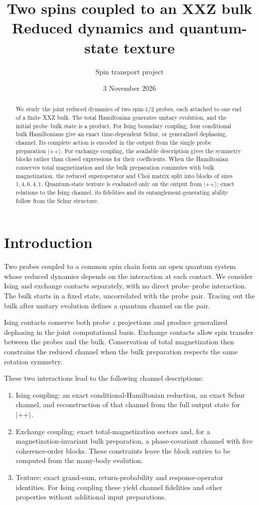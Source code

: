 \documentclass[11pt,a4paper]{article}
\title{Two spins coupled to an XXZ bulk\\[3pt]
\large Reduced dynamics and quantum-state texture}
\author{Spin transport project}
\date{3 November 2026}
\newcommand{\ket}[1]{\lvert #1\rangle}
\begin{document}
\maketitle
\begin{abstract}
We study the joint reduced dynamics of two spin-$1/2$ probes,
each attached to one end of a finite XXZ bulk. The total Hamiltonian generates
unitary evolution, and the initial probe--bulk state is a product. For Ising
boundary coupling, four conditional bulk Hamiltonians give an exact
time-dependent Schur, or generalized dephasing, channel. Its complete action
is encoded in the output from the single probe preparation $\ket{++}$.
For exchange coupling, the available description gives the symmetry
blocks rather than closed expressions for their coefficients. When the Hamiltonian conserves total
magnetization and the bulk preparation commutes with bulk magnetization,
the reduced superoperator and Choi matrix split into blocks of sizes
$1,4,6,4,1$. Quantum-state texture is evaluated only on the output from
$\ket{++}$; exact relations to the Ising channel, its fidelities and its
entanglement-generating ability follow from the Schur structure.
\end{abstract}
\tableofcontents

\section{Introduction}

Two probes coupled to a common spin chain form an open quantum system
whose reduced dynamics depends on the interaction at each contact.
We consider Ising and exchange contacts separately, with no direct
probe--probe interaction. The bulk starts in a fixed state, uncorrelated
with the probe pair. Tracing out the bulk after unitary evolution defines
a quantum channel on the pair.

Ising contacts conserve both probe $z$ projections and produce generalized
dephasing in the joint computational basis. Exchange contacts allow spin
transfer between the probes and the bulk. Conservation of total
magnetization then constrains the reduced channel when the bulk
preparation respects the same rotation symmetry.

These two interactions lead to the following channel descriptions:
\begin{enumerate}
\item Ising coupling: an exact conditional-Hamiltonian reduction, an exact
Schur channel, and reconstruction of that channel from the full output
state for $\ket{++}$.
\item Exchange coupling: exact total-magnetization sectors and, for a
magnetization-invariant bulk preparation, a phase-covariant channel with
five coherence-order blocks. These constraints leave the block entries
to be computed from the many-body evolution.
\item Texture: exact grand-sum, return-probability and response-operator
identities. For Ising coupling these yield channel fidelities and other
properties without additional input preparations.
\end{enumerate}
\end{document}
